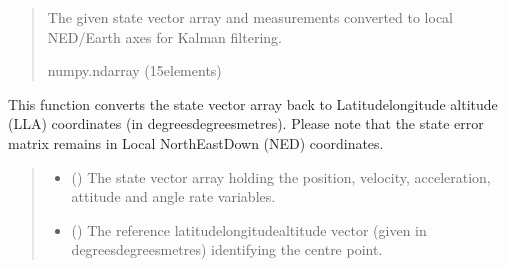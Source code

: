 \documentclass[letterpaper,10pt,english]{sphinxmanual}
\begin{document}
\begin{fulllineitems}
\begin{quote}
\begin{description}
\begin{itemize}
\end{itemize}

\sphinxAtStartPar
The given state vector array and measurements converted to
local NED/Earth axes for Kalman filtering.

\sphinxAtStartPar
numpy.ndarray (15\sphinxhyphen{}elements)

\end{description}\end{quote}

\end{fulllineitems}


\begin{fulllineitems}
\label{\detokenize{modules/fusion/kalman:qnav.fusion.kalman.ned2state_vector}}
\pysigstartsignatures
{}
\pysigstopsignatures
\sphinxAtStartPar
This function converts the state vector array back to Latitude\sphinxhyphen{}longitude\sphinxhyphen{}
altitude (LLA) coordinates (in degrees\sphinxhyphen{}degrees\sphinxhyphen{}metres). Please note that
the state error matrix remains in Local North\sphinxhyphen{}East\sphinxhyphen{}Down (NED) coordinates.
\begin{quote}\begin{description}
\begin{itemize}
\item {} 
\sphinxAtStartPar
{} (\sphinxstyleliteralemphasis{\sphinxupquote{ (}}\sphinxstyleliteralemphasis{\sphinxupquote{)}}) \textendash{} The state vector array holding the position,
velocity, acceleration, attitude and angle rate variables.

\item {} 
\sphinxAtStartPar
{} (\sphinxstyleliteralemphasis{\sphinxupquote{ (}}\sphinxstyleliteralemphasis{\sphinxupquote{)}}) \textendash{} The reference latitude\sphinxhyphen{}longitude\sphinxhyphen{}altitude vector (given in
degrees\sphinxhyphen{}degrees\sphinxhyphen{}metres) identifying the centre point.


\end{itemize}
\end{description}
\end{quote}
\end{fulllineitems}
\end{document}

